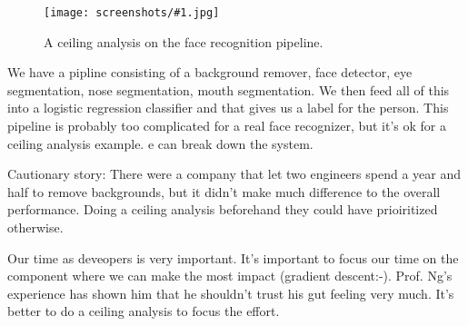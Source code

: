 \documentclass[a4, 12pt, english, USenglish]{scrreprt}
\newcommand{\screenshot}[2]{
\begin{figure}[htb]
\texttt{[image: screenshots/\#1.jpg]}
\label{#1}
\caption{#2}
\end{figure}}
\begin{document}
\screenshot{facerecognitionceilinganalysis}{A ceiling analysis on the
  face recognition pipeline.}

We have a pipline consisting of a background remover, face detector,
eye segmentation, nose segmentation, mouth segmentation.  We then feed
all of this into a logistic regression classifier and that gives us a
label for the person.  This pipeline is probably too complicated for a
real face recognizer, but it's ok for a ceiling analysis example.
e can break down the system.

Cautionary story: There were a company  that let two engineers spend
a year and half to remove backgrounds, but it didn't make much
difference to the overall performance.  Doing a ceiling analysis
beforehand they could have prioiritized otherwise.

Our time as deveopers is very important. It's important to focus our
time on the component where we can make the most impact (gradient
descent:-).   Prof. Ng's experience has shown him that he shouldn't
trust his gut feeling very much.  It's better to do a ceiling analysis
to focus the effort.


\printindex
\end{document}
